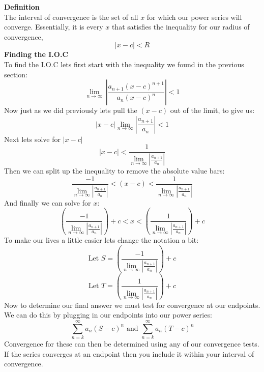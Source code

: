 \documentclass[addpoints]{exam}
\begin{document}
\begin{tcolorbox}[title= INTERVAL OF CONVERGENCE,colframe=black,sharp corners,colback=white,colbacktitle=white,coltitle=black]
    \large \textbf{Definition} \\
    \normalsize The interval of convergence is the set of all $x$ for which our power series will converge. Essentially, it is every $x$ that satisfies the inequality for our radius of convergence, 
    \[
    \left|x-c\right| < R
    \]
    \large \textbf{Finding the I.O.C} \\
    \normalsize To find the I.O.C lets first start with the inequality we found in the previous section:
    \[
    \lim\limits_{n\to\infty}\, \left|\frac{a_{n+1}\left({x-c}\right)^{n+1}}{a_n\left({x-c}\right)^{n}} \right| < 1
    \]
    Now just as we did previously lets pull the $\left(x-c\right)$ out of the limit, to give us:
    \[
    \left|x-c\right| \lim\limits_{n\to\infty}\left|\frac{a_{n+1}}{a_n}\right| < 1
    \] 
    Next lets solve for $\left|x-c\right|$
    \[
     \left|x-c\right| < \frac{1}{ \lim\limits_{n\to\infty}\left|\frac{a_{n+1}}{a_n}\right|}
    \]
    Then we can split up the inequality to remove the absolute value bars:
    \[
    \frac{-1}{\lim\limits_{n\to\infty}\left|\frac{a_{n+1}}{a_n}\right|} < \left(x-c\right) < \frac{1}{ \lim\limits_{n\to\infty}\left|\frac{a_{n+1}}{a_n}\right|}
    \]
    And finally we can solve for $x$:
    \[
    \left(\frac{-1}{\lim\limits_{n\to\infty}\left|\frac{a_{n+1}}{a_n}\right|}\right) + c < x < \left(\frac{1}{ \lim\limits_{n\to\infty}\left|\frac{a_{n+1}}{a_n}\right|}\right) + c
    \]
    To make our lives a little easier lets change the notation a bit:
    \[
    \text{Let } S = \left(\frac{-1}{\lim\limits_{n\to\infty}\left|\frac{a_{n+1}}{a_n}\right|}\right) + c
    \]
    \[
    \text{Let } T = \left(\frac{1}{\lim\limits_{n\to\infty}\left|\frac{a_{n+1}}{a_n}\right|}\right) + c
    \]
    Now to determine our final answer we must test for convergence at our endpoints. We can do this by plugging in our endpoints into our power series:
    \[
    \sum\limits_{n=k}^\infty a_n(S-c)^n
    \text{ and }
    \sum\limits_{n=k}^\infty a_n(T-c)^n
    \]
    Convergence for these can then be determined using any of our convergence tests.
    If the series converges at an endpoint then you include it within your interval of convergence. 
\end{tcolorbox}
\newpage
\end{document}
